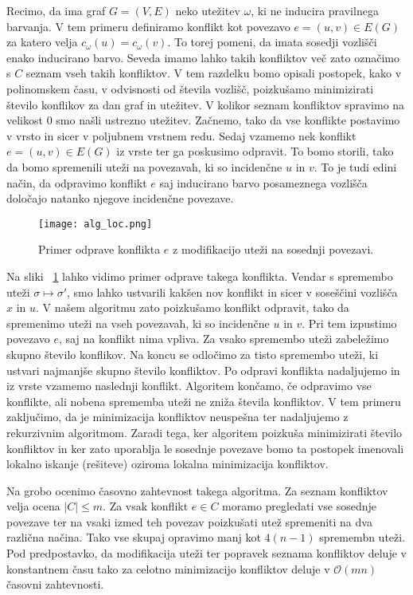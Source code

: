 \documentclass[12pt,a4paper,twoside]{article}
\theoremstyle{definition} %
\theoremstyle{plain} %
\numberwithin{equation}{section}  %
\begin{document}
Recimo, da ima graf $G = (V, E)$ neko utežitev $\omega$, ki ne inducira pravilnega barvanja. V tem primeru definiramo konflikt kot povezavo $e =(u, v) \in E(G)$ za katero velja $c_{\omega}(u) = c_{\omega}(v)$. To torej pomeni, da imata sosedji vozlišči enako inducirano barvo. Seveda imamo lahko takih konfliktov več zato označimo s $C$ seznam vseh takih konfliktov. V tem razdelku bomo opisali postopek, kako v polinomskem času, v odvisnosti od števila vozlišč, poizkušamo minimizirati število konflikov za dan graf in utežitev. V kolikor seznam konfliktov spravimo na velikost $0$ smo našli ustrezno utežitev. Začnemo, tako da vse konflikte postavimo v vrsto in sicer v poljubnem vrstnem redu. Sedaj vzamemo nek konflikt $e = (u, v) \in E(G)$ iz vrste ter ga poskusimo odpravit. To bomo storili, tako da bomo spremenili uteži na povezavah, ki so incidenčne $u$ in $v$. To je tudi edini način, da odpravimo konflikt $e$ saj inducirano barvo posameznega vozlišča določajo natanko njegove incidenčne povezave.
 \begin{figure}[h!]
\caption{Primer odprave konflikta $e$ z modifikacijo uteži na sosednji povezavi.}
\label{alg_loc}
\centering
    \texttt{[image: alg\_loc.png]}
    \end{figure}
Na sliki ~\ref{alg_loc} lahko vidimo primer odprave takega konflikta. Vendar s spremembo uteži $\sigma \mapsto\sigma'$, smo lahko ustvarili kakšen nov konflikt in sicer v soseščini vozlišča $x$ in $u$. V našem algoritmu zato poizkušamo konflikt odpravit, tako da spremenimo uteži na vseh povezavah, ki so incidenčne $u$ in $v$. Pri tem izpustimo povezavo $e$, saj na konflikt nima vpliva. Za vsako spremembo uteži zabeležimo skupno število konflikov. Na koncu se odločimo za tisto spremembo uteži, ki ustvari najmanjše skupno število konfliktov. Po odpravi konflikta nadaljujemo in iz vrste vzamemo naslednji konflikt. Algoritem končamo, če odpravimo vse konflikte, ali nobena sprememba uteži ne zniža števila konfliktov. V tem primeru zaključimo, da je minimizacija konfliktov neuspešna ter nadaljujemo z rekurzivnim algoritmom. Zaradi tega, ker algoritem poizkuša minimizirati število konfliktov in ker zato uporablja le sosednje povezave bomo ta postopek imenovali lokalno iskanje (rešiteve) oziroma lokalna minimizacija konfliktov.

Na grobo ocenimo časovno zahtevnost takega algoritma. Za seznam konfliktov velja ocena $|C| \le m$. Za vsak konflikt $e \in C$ moramo pregledati vse sosednje povezave ter na vsaki izmed teh povezav poizkušati utež spremeniti na dva različna načina. Tako vse skupaj opravimo manj kot $4(n-1)$ spremembn uteži. Pod predpostavko, da modifikacija uteži ter popravek seznama konfliktov deluje v konstantnem času tako za celotno minimizacijo konfliktov deluje v $\mathcal{O}(mn)$ časovni zahtevnosti.
\end{document}

